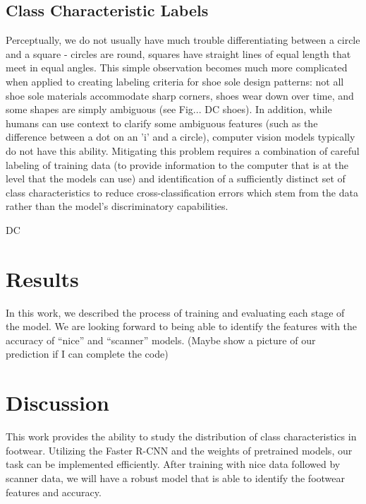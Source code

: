 \documentclass[10pt]{article}
\newcommand{\svp}[1]{{\textcolor{RedOrange}{#1}}}
\begin{document}
\subsection{Class Characteristic Labels}\label{sec:classification-scheme}
\svp{Perceptually, we do not usually have much trouble differentiating between a circle and a square - circles are round, squares have straight lines of equal length that meet in equal angles. This simple observation becomes much more complicated when applied to creating labeling criteria for shoe sole design patterns: not all shoe sole materials accommodate sharp corners, shoes wear down over time, and some shapes are simply ambiguous (see Fig... DC shoes). In addition, while humans can use context to clarify some ambiguous features (such as the difference between a dot on an 'i' and a circle), computer vision models typically do not have this ability. Mitigating this problem requires a combination of careful labeling of training data (to provide information to the computer that is at the level that the models can use) and identification of a sufficiently distinct set of class characteristics to reduce cross-classification errors which stem from the data rather than the model's discriminatory capabilities.}


DC



\section{Results}

In this work, we described the process of training and evaluating each stage of the model. We are looking forward to being able to identify the features with the accuracy of “nice” and “scanner” models.  (Maybe show a picture of our prediction if I can complete the code)



\section{Discussion }
This work provides the ability to study the distribution of class characteristics in footwear. Utilizing the Faster R-CNN and the weights of pretrained models, our task can be implemented efficiently. After training with nice data followed by scanner data, we will have a robust model that is able to identify the footwear features and accuracy.
\end{document}
